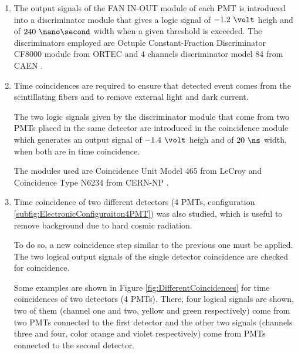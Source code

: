 \begin{enumerate}
\begin{enumerate}

\item{} The output signals of the FAN IN-OUT module of each PMT is introduced into a discriminator module that gives a logic signal of $-1.2~\volt$ heigh and of $240~\nano\second$ width when a given threshold is exceeded. The discriminators employed are  Octuple Constant-Fraction Discriminator CF8000 module from ORTEC \cite{DataSheetDiscriminator} and 4 channels discriminator model 84 from CAEN \cite{DataSheetDiscriminatorCAEN}.

\item{} Time coincidences are required to ensure that detected event comes from the scintillating fibers and to remove external light and dark current. %

The two logic signals given by the discriminator module that come from two PMTs placed in the same detector are introduced in the coincidence module which generates an output signal of $-1.4~\volt$ heigh and of $20~\ns$ width, when both are in time coincidence.

The modules used are Coincidence Unit Model 465 from LeCroy \cite{DataSheetCoincidenceLeCroy} and Coincidence Type N6234 from CERN-NP \cite{DataSheetCoincidenceCERN}.

\item{} Time coincidence of two different detectors (4 PMTs, configuration \ref{subfig:ElectronicConfiguraiton4PMT}) was also studied, which is useful to remove background due to hard cosmic radiation.

To do so, a new coincidence step similar to the previous one must be applied. The two logical output signals of the single detector coincidence are checked for coincidence.

Some examples are shown in Figure \ref{fig:DifferentCoincidences} for time coincidences of two detectors (4 PMTs). There, four logical signals are shown, two of them (channel one and two, yellow and green respectively) come from two PMTs connected to the first detector and the other two signals (channels three and four, color orange and violet respectively) come from PMTs connected to the second detector.


\end{enumerate}
\end{enumerate}
